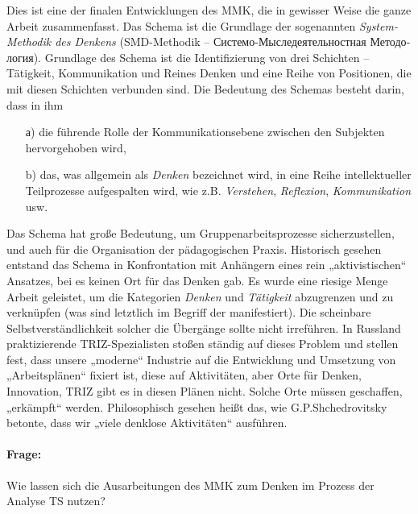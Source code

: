 \documentclass[11pt,a4paper]{article}
\begin{document}
Dies ist eine der finalen Entwicklungen des MMK, die in gewisser Weise die
ganze Arbeit zusammenfasst. Das Schema ist die Grundlage der sogenannten
\emph{System-Methodik des Denkens} (SMD-Methodik --
\foreignlanguage{russian}{Системо-Мыследеятельностная Методология}). Grundlage
des Schema ist die Identifizierung von drei Schichten -- Tätigkeit,
Kommunikation und Reines Denken und eine Reihe von Positionen, die mit diesen
Schichten verbunden sind. Die Bedeutung des Schemas besteht darin, dass in ihm 
\begin{itemize}
\item[а)] die führende Rolle der Kommunikationsebene zwischen den Subjekten
  hervorgehoben wird,
\item[b)] das, was allgemein als \emph{Denken} bezeichnet wird, in eine Reihe
  intellektueller Teilprozesse aufgespalten wird, wie z.B. \emph{Verstehen},
  \emph{Reflexion}, \emph{Kommunikation} usw.
\end{itemize}
Das Schema hat große Bedeutung, um Gruppenarbeitsprozesse sicherzustellen, und
auch für die Organisation der pädagogischen Praxis. Historisch gesehen
entstand das Schema in Konfrontation mit Anhängern eines rein „aktivistischen“
Ansatzes, bei es keinen Ort für das Denken gab. Es wurde eine riesige Menge
Arbeit geleistet, um die Kategorien \emph{Denken} und \emph{Tätigkeit}
abzugrenzen und zu verknüpfen (was sind letztlich im Begriff der
 manifestiert). Die scheinbare Selbstverständlichkeit
solcher die Übergänge sollte nicht irreführen. In Russland praktizierende
TRIZ-Spezialisten stoßen ständig auf dieses Problem und stellen fest, dass
unsere „moderne“ Industrie auf die Entwicklung und Umsetzung von
„Arbeitsplänen“ fixiert ist, diese auf Aktivitäten, aber Orte für Denken,
Innovation, TRIZ gibt es in diesen Plänen nicht. Solche Orte müssen
geschaffen, „erkämpft“ werden. Philosophisch gesehen heißt das, wie
G.P.Shchedrovitsky betonte, dass wir „viele denklose Aktivitäten“ ausführen.

\paragraph{Frage:}
Wie lassen sich die Ausarbeitungen des MMK zum Denken im Prozess der Analyse
TS nutzen?
\end{document}
